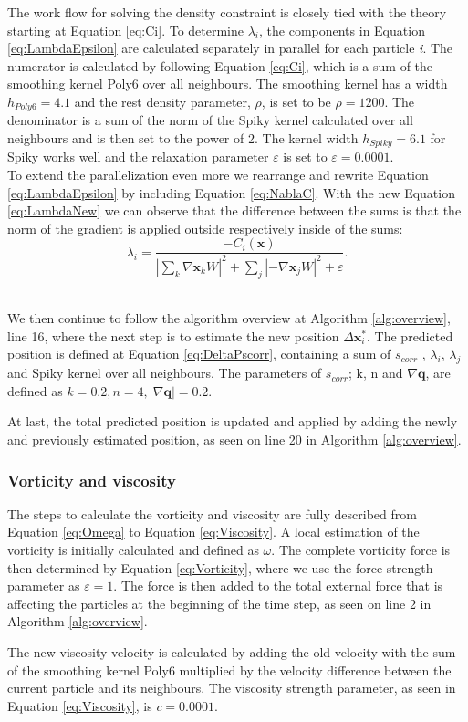 The work flow for solving the density constraint is closely tied with the theory starting at Equation \ref{eq:Ci}.
To determine $\lambda_{i}$, the components in Equation \ref{eq:LambdaEpsilon} are calculated separately in parallel
for each particle \textit{i}.
The numerator is calculated by following Equation \ref{eq:Ci}, which is a sum of the smoothing kernel Poly6 over
all neighbours. The smoothing kernel has a width $h_{Poly6} = 4.1$ and the rest density parameter, $\rho$, is set to be $\rho = 1200$.
The denominator is a sum of the norm of the Spiky kernel calculated over all neighbours
and is then set to the power of 2. The kernel width $h_{Spiky} = 6.1$ for Spiky works well and the
relaxation parameter $\varepsilon$ is set to $\varepsilon = 0.0001$.
\\
\newline
To extend the parallelization even more we rearrange and rewrite Equation \ref{eq:LambdaEpsilon} by including Equation \ref{eq:NablaC}. With the
new Equation \ref{eq:LambdaNew} we can observe that the difference between the sums is that the norm of the gradient is applied
outside respectively inside of the sums:
\\
\begin{equation}
\label{eq:LambdaNew}
\lambda_i = \frac{- C_i(\mathbf{x}) }{ |\sum\limits_{k} \nabla \mathbf{x}_k W|^{2} + \sum\limits_{j} |-\nabla \mathbf{x}_j W|^2  + \varepsilon}.
\end{equation}
\\
\newline

We then continue to follow the algorithm overview at Algorithm \ref{alg:overview}, line 16, where the next step is to estimate the new position $\Delta \mathbf{x}^{*}_{i}$.
The predicted position is defined at Equation \ref{eq:DeltaPscorr}, containing a sum of $s_{corr}$ , $\lambda_{i}$, $\lambda_{j}$
and Spiky kernel over all neighbours.
The parameters of $s_{corr}$; k, n and $ \nabla \mathbf{q}$, are defined as $k = 0.2, n = 4, |\nabla \mathbf{q}| = 0.2$.

At last, the total predicted position is updated and applied by adding the newly and previously estimated position,
as seen on line 20 in Algorithm \ref{alg:overview}.

\subsubsection{Vorticity and viscosity}
The steps to calculate the vorticity and viscosity are fully described from Equation \ref{eq:Omega} to Equation \ref{eq:Viscosity}.
A local estimation of the vorticity is initially calculated and defined as $\omega$. The complete vorticity force is then determined
by Equation \ref{eq:Vorticity}, where we use the force strength parameter as $\varepsilon = 1$. The force is then added to the total
external force that is affecting the particles at the beginning of the time step, as seen on line 2 in Algorithm \ref{alg:overview}.

The new viscosity velocity is calculated by adding the old velocity with the sum of the smoothing kernel Poly6 multiplied by the velocity difference between
the current particle and its neighbours. The viscosity strength parameter, as seen in Equation \ref{eq:Viscosity}, is $c = 0.0001$.
